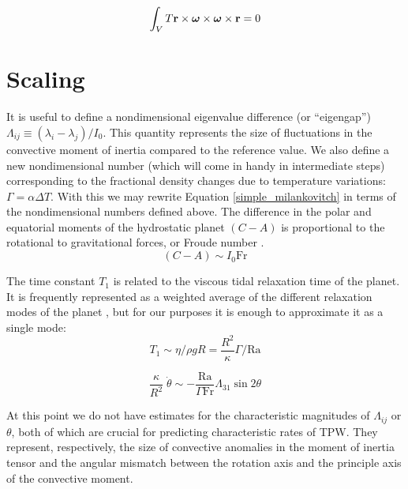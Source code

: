 \documentclass[extra,mreferee]{gji}
\begin{document}
\begin{equation}
\begin{aligned}
\int_V T {\bf r \times \mitbf{\omega} \times \mitbf{\omega} \times r} = 0 \\
\end{aligned}
\end{equation}

\section{Scaling}
\label{sec:scaling}

It is useful to define a nondimensional eigenvalue difference (or ``eigengap'') $\Lambda_{ij} \equiv (\lambda_i - \lambda_j)/I_0$.  
This quantity represents the size of fluctuations in the convective moment of inertia compared to the reference value.
We also define a new nondimensional number (which will come in handy in intermediate steps) corresponding to the fractional density changes due to temperature variations: $\Gamma = \alpha \Delta T$.
With this we may rewrite Equation \ref{simple_milankovitch} in terms of the nondimensional numbers defined above.
The difference in the polar and equatorial moments of the hydrostatic planet $(C-A)$ is proportional to the rotational to gravitational forces, or Froude number \citep[e.g.][]{??}.
\begin{equation}
(C-A) \sim I_0 \mathrm{Fr}
\end{equation}

The time constant $T_1$ is related to the viscous tidal relaxation time of the planet. It is frequently represented as a weighted average of the different relaxation modes of the planet \citep[e.g.][]{ricard1993polar, greff2004upwelling}, but for our purposes it is enough to approximate it as a single mode:
\begin{equation}
T_1 \sim \eta / \rho g R = \frac{R^2}{\kappa} \Gamma/\mathrm{Ra}
\end{equation}

\begin{equation}
\frac{\kappa}{R^2} \; \dot{\theta} \sim - \frac{\mathrm{Ra}}{\Gamma \mathrm{Fr}} \Lambda_{31} \sin{2 \theta}
\label{scaled_rotation}
\end{equation}

At this point we do not have estimates for the characteristic magnitudes of $\Lambda_{ij}$ or $\theta$, both of which are crucial for predicting characteristic rates of TPW.
They represent, respectively, the size of convective anomalies in the moment of inertia tensor and the angular mismatch between the rotation axis and the principle axis of the convective moment.
\end{document}
